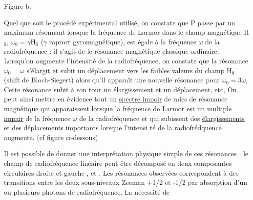 \hfill
\begin{minipage}[c]{.3\linewidth}
\begin{center} 

Figure b.
\end{center}
\end{minipage}

Quel que soit le procédé expérimental utilisé, on constate que P
passe par un maximum résonnant lorsque la fréquence de Larmor dans le champ
magnétique H$_0$, $\omega_0=\gamma$H$_0$ ($\gamma$ raprort gyromagnétique), est égale à la fréquence
$\omega$ de la radiofréquence : il s'agit de le résonance magnétique classique ordinaire. 
Lorsqu'on augmente l'intensité de la radiofréquence, on constate que
la résonance $\omega_0=\omega$ s'élargit et subit un déplacement vers les faibles valeurs du champ H$_0$
(shift de Bloch-Siegert) alors qu'il apparaît une nouvelle
résonance pour $\omega_0=3\omega$, Cette résonance subit à son tour un élargissement et
un déplacement, etc, On peut ainsi mettre en évidence tout un \ul{spectre impair}
de raies de résonance magnétique qui apparaissent lorsque la fréquence de
Larmor est un multiple \ul{impair} de la fréquence $\omega$ de la radiofréquence et qui
subissent des \ul{élargissements} et des \ul{déplacements} importants lorsque l'intensi
té de la radiofrédquence augmente. (cf figure ci-dessous)
\begin{center}  \end{center}

Il est possible de donner une interprétation physique simple de ces
résonances : le champ de radiofréquence linéaire peut être décomposé en deux
composantes circulaires droite et gauche , et . Les résonances observées correspondent
à des transitions entre les deux sous-niveaux Zeeman +1/2 et -1/2
par absorption d'un ou plusieurs photons de radiofréquence. La nécessité de

